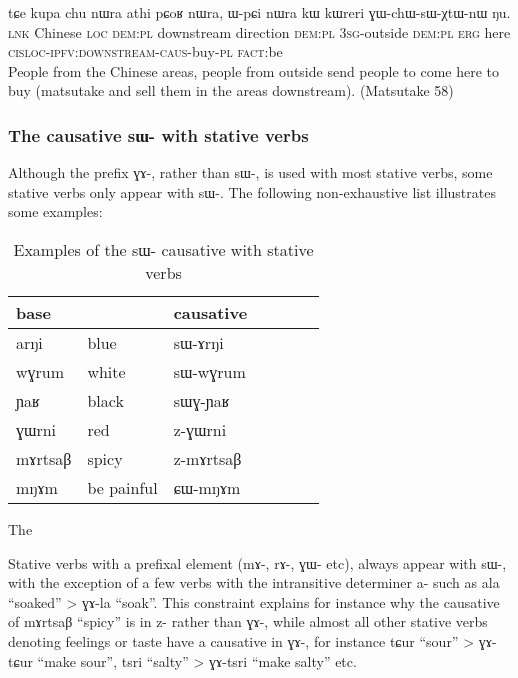\documentclass[oldfontcommands,oneside,a4paper,11pt]{article}
\newcommand{\ipa}[1]{{\phon \mbox{#1}}} %
\begin{document}
  \begin{exe}
\ex \label{ex:assoc.motion2}
\gll
\ipa{tɕe} 	\ipa{kupa} 	\ipa{chu} 	\ipa{nɯra} 	\ipa{athi} 	\ipa{pɕoʁ} 	\ipa{nɯra,} 	\ipa{ɯ-pɕi} 	\ipa{nɯra} 	\ipa{kɯ} 	\ipa{kɯreri} 	\ipa{ɣɯ-chɯ-sɯ-χtɯ-nɯ} 	\ipa{ŋu.}  \\
\textsc{lnk} Chinese \textsc{loc} \textsc{dem:pl} downstream direction \textsc{dem:pl} \textsc{3sg}-outside  \textsc{dem:pl}  \textsc{erg} here \textsc{cisloc-ipfv:downstream-caus}-buy-\textsc{pl} \textsc{fact}:be \\
\glt People from the Chinese areas, people from outside send people to come here to buy (matsutake and sell them in the areas downstream). (Matsutake 58)
  \end{exe} 



 \subsubsection{The causative \ipa{sɯ-} with stative verbs} \label{subsub:caus.sW.stative}
 Although the prefix \ipa{ɣɤ-}, rather than \ipa{sɯ-}, is used with most stative verbs, some stative verbs only appear with \ipa{sɯ-}. The following non-exhaustive list illustrates some examples:
 \begin{table}[H]
\caption{Examples of the \ipa{sɯ}- causative with stative verbs }\label{tab:causative.sW.stative}
\begin{tabular}{lllllll} \toprule
  base  & &causative  \\
\midrule
   \ipa{arŋi} & blue & \ipa{sɯ-ɤrŋi} \\
 \ipa{wɣrum} & white & \ipa{sɯ-wɣrum} \\
 \ipa{ɲaʁ} & black & \ipa{sɯɣ-ɲaʁ} \\
  \ipa{ɣɯrni} & red & \ipa{z-ɣɯrni} \\
    \ipa{mɤrtsaβ} & spicy & \ipa{z-mɤrtsaβ} \\
       \ipa{mŋɤm} & be painful & \ipa{ɕɯ-mŋɤm} \\
\bottomrule
\end{tabular}
\end{table}
 The 
   
 
   
    Stative verbs with a prefixal element (\ipa{mɤ-}, \ipa{rɤ-}, \ipa{ɣɯ-} etc), always appear with \ipa{sɯ-}, with the exception of a few verbs with the intransitive determiner \ipa{a-} such as \ipa{ala}  ``soaked'' > \ipa{ɣɤ-la}  ``soak''. This constraint explains for instance why the causative of \ipa{mɤrtsaβ}  ``spicy'' is  in \ipa{z-} rather than \ipa{ɣɤ-}, while almost all other stative verbs denoting feelings or taste have a causative in \ipa{ɣɤ-}, for instance \ipa{tɕur}  ``sour'' > \ipa{ɣɤ-tɕur}  ``make   sour'',   \ipa{tsri}  ``salty'' > \ipa{ɣɤ-tsri}  ``make   salty'' etc.  
  
\end{document}
